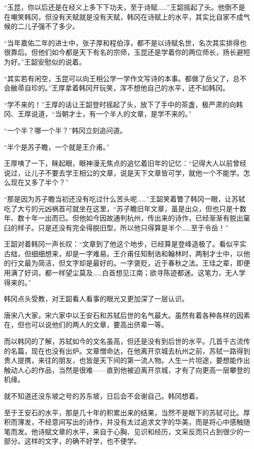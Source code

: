 “玉昆，你以后还是在经义上多下下功夫，至于诗赋……”王韶摇起了头。他倒不是在嘲笑韩冈，但没有天赋就是没有天赋，韩冈在诗赋上的水平，其实比自家不成气候的二儿子强不了多少。

“当年嘉佑二年的进士中，张子厚和程伯淳，都不是以诗赋名世，名次其实排得也很靠后。但他们如今都是天下有名的宗师，玉昆还是学着你的两位师长，扬长避短为好。”王韶安慰似的说着。

“其实若有闲空，玉昆可以向王相公学一学作文写诗的本事。都做了岳父了，总不会敝帚自珍的。”王厚拿着韩冈开玩笑，浑不想他自己的水平，还不如韩冈。

“学不来的！”王厚的话让王韶登时摇起了头，放下了手中的茶盏，极严肃的向韩冈、王厚说道，“当朝才士，有一个半人的文章，是学不来的。”

“一个半？哪一个半？”韩冈立刻追问道。

“半个是苏子瞻，一个就是王介甫。”

王厚咦了一下，眯起眼，眼神漫无焦点的追忆着旧年的记忆：“记得大人以前曾经说过，让儿子不要去学王相公的文章，说是天下文章皆可学，就他一个不能学。怎么现在又多了半个？”

“那是因为苏子瞻当初还没有吃过什么苦头呢……”王韶笑着瞥了韩冈一眼，让苏轼吃了大亏的元凶祸首可就坐在这里，“苏子瞻旧年文章，虽是出众，但也只是十数年、数十年一出而已。但他如今因故通判杭州，传出来的诗作，已经渐渐有脱出窠臼的样子。只是还没有完全得脱旧型，所以他只得算是半个……至于令岳！”

王韶对着韩冈一声长叹：“文章到了他这个地步，已经算是登峰造极了。看似平实古绌，但细细想来，却是一字难易。王介甫任知制诰和翰林时，两制才士中，以他的行文最为简洁，但文字却是最好的。一字褒贬，近于春秋之法。王珪之辈，即便用满了好词，都一样望尘莫及……白首想见江南；欲寻陈迹都迷。这笔力，无人学得来的。”

韩冈点头受教，对王韶看人看事的眼光又更加深了一层认识。

唐宋八大家，宋六家中以王安石和苏轼后世的名气最大。虽然有着各种各样的因素在，但也可以说他们的两人的文章，要高出侪辈一等。

而以韩冈的了解，苏轼如今的文名虽高，但还是没有到后世的水平。几首千古流传的名篇，现在也没有出炉。文章憎命达，在他离开京城去杭州之前，苏轼一路得到贵人提携，来往的朋友，也皆是天下间的第一流人物。人生一片坦途，要想能作出触动人心的作品，当然是很难——直到他被迫离开京城，才有了向更高一层攀登的机缘。

就不知道还没东坡之号的苏东坡，日后会不会谢自己。韩冈想着。

至于王安石的水平，那是几十年的积累出来的结果，当然不是眼下的苏轼可比。厚积而薄发，不经意间写出的诗作，并没有太过追求文字的华美，而是将心中感触随笔而发。他诗赋文章的水平，来自于心胸、见识和经历，文采反而只占到很少的一部分。这样的文字，的确不好学，也不便学。

